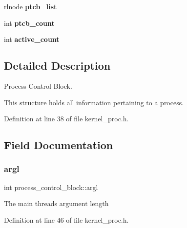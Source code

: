 \begin{DoxyCompactItemize}
\item 
\mbox{\label{structprocess__control__block_a74d25ccd09397ac4a5984493bb1a5875}} 
\hyperlink{group__rlists_ga8f6244877f7ce2322c90525217ea6e7a}{rlnode} {\bfseries ptcb\+\_\+list}
\item 
\mbox{\label{structprocess__control__block_a58132ccf90399c4f42053c7ccf1c4e16}} 
int {\bfseries ptcb\+\_\+count}
\item 
\mbox{\label{structprocess__control__block_ab8835e8fec4cb549d3b47a45aa020fc1}} 
int {\bfseries active\+\_\+count}
\end{DoxyCompactItemize}


\subsection{Detailed Description}
Process Control Block. 

This structure holds all information pertaining to a process. 

Definition at line 38 of file kernel\+\_\+proc.\+h.



\subsection{Field Documentation}
\mbox{\label{structprocess__control__block_a8c8667a0f61f4380b3d5c69c57315511}} 
\subsubsection{\texorpdfstring{argl}{argl}}
{\footnotesize\ttfamily int process\+\_\+control\+\_\+block\+::argl}

The main thread\textquotesingle{}s argument length 

Definition at line 46 of file kernel\+\_\+proc.\+h.

\mbox{\label{structprocess__control__block_af7ac33b69a8a1dc582e0fa35cc90568a}} 
